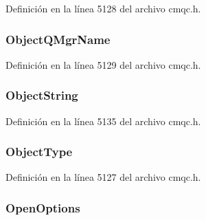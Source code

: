 Definición en la línea 5128 del archivo cmqc.\+h.

\hypertarget{structtag_m_q_s_t_s_ac72719d0cdc669269aa503462d5c7536}{}
\subsubsection[{Object\+Q\+Mgr\+Name}]{ Object\+Q\+Mgr\+Name}\label{structtag_m_q_s_t_s_ac72719d0cdc669269aa503462d5c7536}


Definición en la línea 5129 del archivo cmqc.\+h.

\hypertarget{structtag_m_q_s_t_s_a564791473371222ceb856cfaf02d6f91}{}
\subsubsection[{Object\+String}]{ Object\+String}\label{structtag_m_q_s_t_s_a564791473371222ceb856cfaf02d6f91}


Definición en la línea 5135 del archivo cmqc.\+h.

\hypertarget{structtag_m_q_s_t_s_afe2238efcfc6d8a8de58f0622bb31caa}{}
\subsubsection[{Object\+Type}]{ Object\+Type}\label{structtag_m_q_s_t_s_afe2238efcfc6d8a8de58f0622bb31caa}


Definición en la línea 5127 del archivo cmqc.\+h.

\hypertarget{structtag_m_q_s_t_s_aba7271572b7c49b5295b03e379f59686}{}
\subsubsection[{Open\+Options}]{ Open\+Options}\label{structtag_m_q_s_t_s_aba7271572b7c49b5295b03e379f59686}


